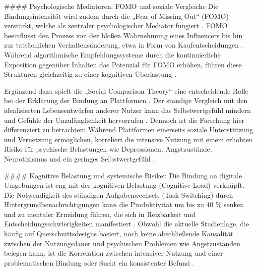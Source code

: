 \documentclass[11pt,a4paper]{article}
\begin{document}
\#\#\#\# Psychologische Mediatoren: FOMO und soziale Vergleiche Die Bindungsintensität wird zudem durch die „Fear of Missing Out“ (FOMO) verstärkt, welche als zentraler psychologischer Mediator fungiert \autocite{doaj_11fd8100d4c74b18ab12a6bed2c1d2c0}. FOMO beeinflusst den Prozess von der bloßen Wahrnehmung eines Influencers bis hin zur tatsächlichen Verhaltensänderung, etwa in Form von Kaufentscheidungen \autocite{doaj_11fd8100d4c74b18ab12a6bed2c1d2c0}. Während algorithmische Empfehlungssysteme durch die kontinuierliche Exposition gegenüber Inhalten das Potenzial für FOMO erhöhen, führen diese Strukturen gleichzeitig zu einer kognitiven Überlastung \autocite{grey_grey_d4bc9c0d0e8441ba90398520e73af07d,grey_grey_bbc8a51d8734471c850e8c2939fe8d32}.

Ergänzend dazu spielt die „Social Comparison Theory“ eine entscheidende Rolle bei der Erklärung der Bindung an Plattformen \autocite{openalex_W2924664363}. Der ständige Vergleich mit den idealisierten Lebensentwürfen anderer Nutzer kann das Selbstwertgefühl mindern und Gefühle der Unzulänglichkeit hervorrufen \autocite{grey_grey_3467cac0f11d4b1e86319128da218a3e,grey_grey_f99abd6bfbd04efc8def60bb6988ce35}. Dennoch ist die Forschung hier differenziert zu betrachten: Während Plattformen einerseits soziale Unterstützung und Vernetzung ermöglichen, korreliert die intensive Nutzung mit einem erhöhten Risiko für psychische Belastungen wie Depressionen, Angstzustände, Neurotizismus und ein geringes Selbstwertgefühl \autocite{doaj_10febcbb5e60420699a1d4570a075832,openalex_W2924664363,grey_grey_3467cac0f11d4b1e86319128da218a3e}.

\#\#\#\# Kognitive Belastung und systemische Risiken Die Bindung an digitale Umgebungen ist eng mit der kognitiven Belastung (Cognitive Load) verknüpft. Die Notwendigkeit des ständigen Aufgabenwechsels (Task-Switching) durch Hintergrundbenachrichtigungen kann die Produktivität um bis zu 40 \% senken und zu mentaler Ermüdung führen, die sich in Reizbarkeit und Entscheidungsschwierigkeiten manifestiert \autocite{grey_grey_d4bc9c0d0e8441ba90398520e73af07d}. Obwohl die aktuelle Studienlage, die häufig auf Querschnittsdesigns basiert, noch keine abschließende Kausalität zwischen der Nutzungsdauer und psychischen Problemen wie Angstzuständen belegen kann, ist die Korrelation zwischen intensiver Nutzung und einer problematischen Bindung oder Sucht ein konsistenter Befund \autocite{openalex_W2924664363,doaj_10febcbb5e60420699a1d4570a075832,crossref_10_55032_atskj_psychol_2020_1103}.
\end{document}
